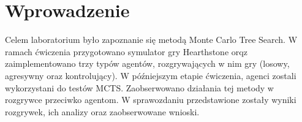 \section{Wprowadzenie}

Celem laboratorium było zapoznanie się metodą Monte Carlo Tree Search. W ramach ćwiczenia przygotowano symulator gry Hearthstone orqz zaimplementowano trzy typów agentów, rozgrywających w nim gry (losowy, agresywny oraz kontrolujący). W późniejszym etapie ćwiczenia, agenci zostali wykorzystani do testów MCTS. Zaobserwowano działania tej metody w rozgrywce przeciwko agentom. W sprawozdaniu przedstawione zostały wyniki rozgrywek, ich analizy oraz zaobserwowane wnioski.